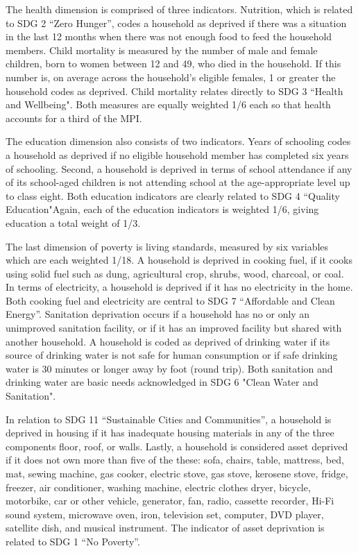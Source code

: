 \documentclass[a4paper,12pt]{article}
\theoremstyle{plain}
\theoremstyle{definition}
\theoremstyle{definition}
\theoremstyle{definition}
\theoremstyle{definition}
\begin{document}
The health dimension is comprised of three indicators. Nutrition, which is related to SDG 2 ``Zero Hunger'', codes a household as deprived if there was a situation in the last 12 months when there was not enough food to feed the household members. Child mortality is measured by the number of male and female children, born to women between 12 and 49, who died in the household. If this number is, on average across the household's eligible females, 1 or greater the household codes as deprived. Child mortality relates directly to SDG 3 ``Health and Wellbeing". Both measures are equally weighted 1/6 each so that health accounts for a third of the MPI. 

The education dimension also consists of two indicators. Years of schooling codes a household as deprived if no eligible household member has completed six years of schooling. Second, a household is deprived in terms of school attendance if any of its school-aged children is not attending school at the age-appropriate level up to class eight. Both education indicators are clearly related to SDG 4 ``Quality Education"Again, each of the education indicators is weighted 1/6, giving education a total weight of 1/3.

The last dimension of poverty is living standards, measured by six variables which are each weighted 1/18. A household is deprived in cooking fuel, if it cooks using solid fuel such as dung, agricultural crop, shrubs, wood, charcoal, or coal. In terms of electricity, a household is deprived if it has no electricity in the home. Both cooking fuel and electricity are central to SDG 7 ``Affordable and Clean Energy''. Sanitation deprivation occurs if a household has no or only an unimproved sanitation facility, or if it has an improved facility but shared with another household. A household is coded as deprived of drinking water if its source of drinking water is not safe for human consumption or if safe drinking water is 30 minutes or longer away by foot (round trip). Both sanitation and drinking water are basic needs acknowledged in SDG 6 "Clean Water and Sanitation".

In relation to SDG 11 ``Sustainable Cities and Communities'', a household is deprived in housing if it has inadequate housing materials in any of the three components floor, roof, or walls. Lastly, a household is considered asset deprived if it does not own more than five of the these: sofa, chairs, table, mattress, bed, mat, sewing machine, gas cooker, electric stove, gas stove, kerosene stove, fridge, freezer, air conditioner, washing machine, electric clothes dryer, bicycle, motorbike, car or other vehicle, generator, fan, radio, cassette recorder, Hi-Fi sound system, microwave oven, iron, television set, computer, DVD player, satellite dish, and musical instrument. The indicator of asset deprivation is related to SDG 1 ``No Poverty''.
\end{document}
